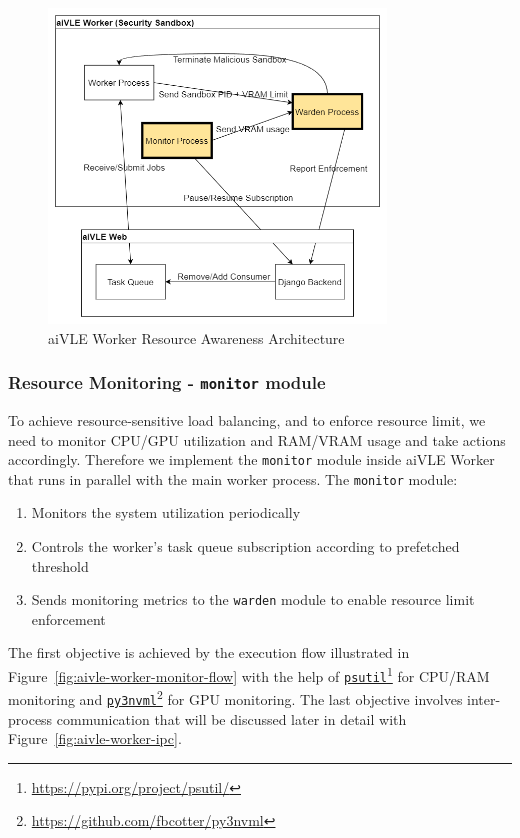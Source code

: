 \begin{figure}[H]
    \centering
    \includegraphics[width=0.8\textwidth]{images/aivle-worker-resource-awareness-arch.png}
    \caption{aiVLE Worker Resource Awareness Architecture}
    \label{fig:aivle-worker-resource-awareness-arch}
\end{figure}

\subsubsection{Resource Monitoring - \texttt{monitor} module}
\label{sss:monitor}
To achieve resource-sensitive load balancing, and to enforce resource limit, we need to monitor CPU/GPU utilization and RAM/VRAM usage and take actions accordingly. Therefore we implement the \texttt{monitor} module inside aiVLE Worker that runs in parallel with the main worker process. The \texttt{monitor} module:
\begin{enumerate}
    \item Monitors the system utilization periodically
    \item Controls the worker's task queue subscription according to prefetched threshold
    \item Sends monitoring metrics to the \texttt{warden} module to enable resource limit enforcement
\end{enumerate}

The first objective is achieved by the execution flow illustrated in Figure~\ref{fig:aivle-worker-monitor-flow} with the help of \href{https://pypi.org/project/psutil/}{\texttt{psutil}}\footnote{\href{https://pypi.org/project/psutil/}{https://pypi.org/project/psutil/}} for CPU/RAM monitoring and \href{https://github.com/fbcotter/py3nvml}{\texttt{py3nvml}}\footnote{\href{https://github.com/fbcotter/py3nvml}{https://github.com/fbcotter/py3nvml}} for GPU monitoring. The last objective involves inter-process communication that will be discussed later in detail with Figure~\ref{fig:aivle-worker-ipc}.

